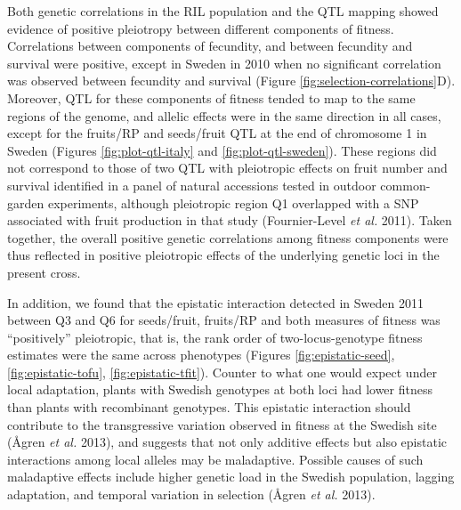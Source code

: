 \documentclass[]{article}
\begin{document}
Both genetic correlations in the RIL population and the QTL mapping showed evidence of positive pleiotropy between different components of fitness. Correlations between components of fecundity, and between fecundity and survival were positive, except in Sweden in 2010 when no significant correlation was observed between fecundity and survival (Figure \ref{fig:selection-correlations}D). Moreover, QTL for these components of fitness tended to map to the same regions of the genome, and allelic effects were in the same direction in all cases, except for the fruits/RP and seeds/fruit QTL at the end of chromosome 1 in Sweden (Figures \ref{fig:plot-qtl-italy} and \ref{fig:plot-qtl-sweden}). These regions did not correspond to those of two QTL with pleiotropic effects on fruit number and survival identified in a panel of natural accessions tested in outdoor common-garden experiments, although pleiotropic region Q1 overlapped with a SNP associated with fruit production in that study (Fournier-Level \emph{et al.} 2011). Taken together, the overall positive genetic correlations among fitness components were thus reflected in positive pleiotropic effects of the underlying genetic loci in the present cross.

In addition, we found that the epistatic interaction detected in Sweden 2011 between Q3 and Q6 for seeds/fruit, fruits/RP and both measures of fitness was ``positively'' pleiotropic, that is, the rank order of two-locus-genotype fitness estimates were the same across phenotypes (Figures \ref{fig:epistatic-seed}, \ref{fig:epistatic-tofu}, \ref{fig:epistatic-tfit}). Counter to what one would expect under local adaptation, plants with Swedish genotypes at both loci had lower fitness than plants with recombinant genotypes. This epistatic interaction should contribute to the transgressive variation observed in fitness at the Swedish site (Ågren \emph{et al.} 2013), and suggests that not only additive effects but also epistatic interactions among local alleles may be maladaptive. Possible causes of such maladaptive effects include higher genetic load in the Swedish population, lagging adaptation, and temporal variation in selection (Ågren \emph{et al.} 2013).
\end{document}
